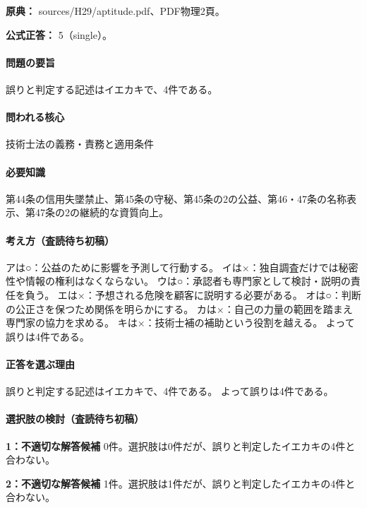 \noindent\textbf{原典：} sources/H29/aptitude.pdf、PDF物理2頁。

\textbf{公式正答：} 5（single）。

\paragraph{問題の要旨} 誤りと判定する記述はイエカキで、4件である。

\paragraph{問われる核心} 技術士法の義務・責務と適用条件

\paragraph{必要知識} 第44条の信用失墜禁止、第45条の守秘、第45条の2の公益、第46・47条の名称表示、第47条の2の継続的な資質向上。

\paragraph{考え方（査読待ち初稿）} アは○：公益のために影響を予測して行動する。 イは×：独自調査だけでは秘密性や情報の権利はなくならない。 ウは○：承認者も専門家として検討・説明の責任を負う。 エは×：予想される危険を顧客に説明する必要がある。 オは○：判断の公正さを保つため関係を明らかにする。 カは×：自己の力量の範囲を踏まえ専門家の協力を求める。 キは×：技術士補の補助という役割を越える。 よって誤りは4件である。

\paragraph{正答を選ぶ理由} 誤りと判定する記述はイエカキで、4件である。  よって誤りは4件である。

\paragraph{選択肢の検討（査読待ち初稿）}\mbox{}\par

\noindent\textbf{1：不適切な解答候補} 0件。選択肢は0件だが、誤りと判定したイエカキの4件と合わない。\par

\noindent\textbf{2：不適切な解答候補} 1件。選択肢は1件だが、誤りと判定したイエカキの4件と合わない。\par

